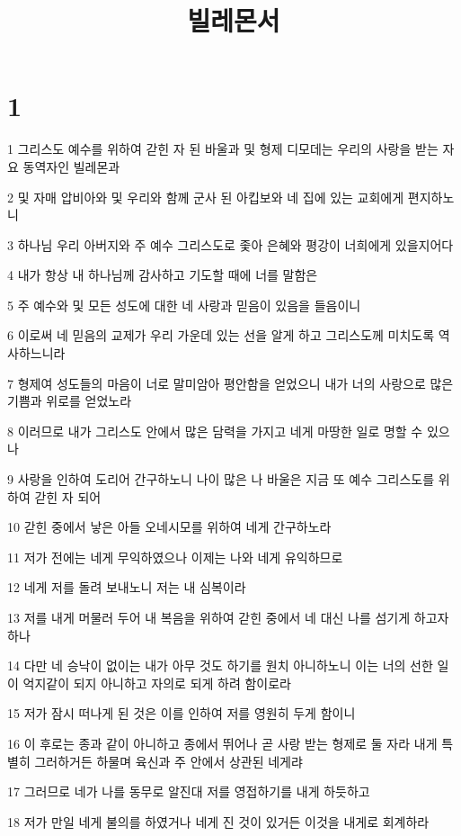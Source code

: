 

\title{빌레몬서}


\chapter{1}

\par 1 그리스도 예수를 위하여 갇힌 자 된 바울과 및 형제 디모데는 우리의 사랑을 받는 자요 동역자인 빌레몬과
\par 2 및 자매 압비아와 및 우리와 함께 군사 된 아킵보와 네 집에 있는 교회에게 편지하노니
\par 3 하나님 우리 아버지와 주 예수 그리스도로 좇아 은혜와 평강이 너희에게 있을지어다
\par 4 내가 항상 내 하나님께 감사하고 기도할 때에 너를 말함은
\par 5 주 예수와 및 모든 성도에 대한 네 사랑과 믿음이 있음을 들음이니
\par 6 이로써 네 믿음의 교제가 우리 가운데 있는 선을 알게 하고 그리스도께 미치도록 역사하느니라
\par 7 형제여 성도들의 마음이 너로 말미암아 평안함을 얻었으니 내가 너의 사랑으로 많은 기쁨과 위로를 얻었노라
\par 8 이러므로 내가 그리스도 안에서 많은 담력을 가지고 네게 마땅한 일로 명할 수 있으나
\par 9 사랑을 인하여 도리어 간구하노니 나이 많은 나 바울은 지금 또 예수 그리스도를 위하여 갇힌 자 되어
\par 10 갇힌 중에서 낳은 아들 오네시모를 위하여 네게 간구하노라
\par 11 저가 전에는 네게 무익하였으나 이제는 나와 네게 유익하므로
\par 12 네게 저를 돌려 보내노니 저는 내 심복이라
\par 13 저를 내게 머물러 두어 내 복음을 위하여 갇힌 중에서 네 대신 나를 섬기게 하고자 하나
\par 14 다만 네 승낙이 없이는 내가 아무 것도 하기를 원치 아니하노니 이는 너의 선한 일이 억지같이 되지 아니하고 자의로 되게 하려 함이로라
\par 15 저가 잠시 떠나게 된 것은 이를 인하여 저를 영원히 두게 함이니
\par 16 이 후로는 종과 같이 아니하고 종에서 뛰어나 곧 사랑 받는 형제로 둘 자라 내게 특별히 그러하거든 하물며 육신과 주 안에서 상관된 네게랴
\par 17 그러므로 네가 나를 동무로 알진대 저를 영접하기를 내게 하듯하고
\par 18 저가 만일 네게 불의를 하였거나 네게 진 것이 있거든 이것을 내게로 회계하라
